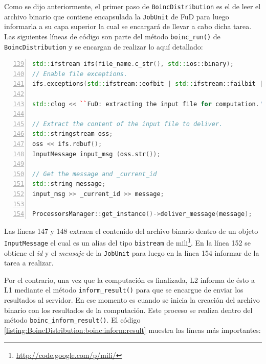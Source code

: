 Como se dijo anteriormente, el primer paso de \texttt{BoincDistribution} es el de leer el archivo binario que contiene encapsulada la \texttt{JobUnit} de FuD para luego informarla a su capa superior la cual se encargará de llevar a cabo dicha tarea. Las siguientes líneas de código son parte del método \texttt{boinc\_run()} de \texttt{BoincDistribution} y se encargan de realizar lo aquí detallado:\\

\begin{lstlisting}[frame=shadowbox, language=C++, numbers=left, xleftmargin=8mm, framexleftmargin=22pt, basicstyle=\scriptsize, numberstyle=\footnotesize, breaklines=true, breakatwhitespace=false, captionpos=b, caption={Parte del método \texttt{boinc\_run()} de la clase \texttt{BoincDistribution}}, label=listing:BoincDistribution:boinc:run, backgroundcolor=\color{gris}, firstnumber=139, keywordstyle=\color{Blue}]
std::ifstream ifs(file_name.c_str(), std::ios::binary);
// Enable file exceptions.
ifs.exceptions(std::ifstream::eofbit | std::ifstream::failbit | std::ifstream::badbit);

std::clog << ``FuD: extracting the input file for computation.'' << std::endl;
        
// Extract the content of the input file to deliver.
std::stringstream oss;
oss << ifs.rdbuf();
InputMessage input_msg (oss.str());

// Get the message and _current_id
std::string message;
input_msg >> _current_id >> message;

ProcessorsManager::get_instance()->deliver_message(message);
\end{lstlisting}

Las líneas 147 y 148 extraen el contenido del archivo binario dentro de un objeto \texttt{InputMessage} el cual es un alias del tipo \texttt{bistream} de mili\footnote{\url{http://code.google.com/p/mili/}}. En la línea 152 se obtiene el \textit{id} y el \textit{mensaje} de la \texttt{JobUnit} para luego en la línea 154 informar de la tarea a realizar.

Por el contrario, una vez que la computación es finalizada, L2 informa de ésto a L1 mediante el método \texttt{inform\_result()} para que se encargue de enviar los resultados al servidor. En ese momento es cuando se inicia la creación del archivo binario con los resultados de la computación. Este proceso se realiza dentro del método \texttt{boinc\_inform\_result()}. El código \ref{listing:BoincDistribution:boinc:inform:result} muestra las líneas más importantes:

